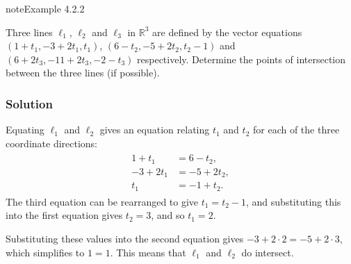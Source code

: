 \documentclass[letterpaper,10pt,english]{jupyterBook}
\begin{document}
\label{_pages/4.1_Lines:line-line-intersection-example}
\begin{sphinxadmonition}{note}{Example 4.2.2}



\sphinxAtStartPar
Three lines \(\ell_1\), \(\ell_2\) and \(\ell_3\) in \(\mathbb{R}^3\) are defined by the vector equations \((1 + t_1, -3 + 2t_1, t_1)\), \((6 - t_2, -5 + 2t_2, t_2 - 1)\) and \((6 + 2t_3, -11 + 2t_3, -2 - t_3)\) respectively. Determine the points of intersection between the three lines (if possible).
\subsubsection*{Solution}

\sphinxAtStartPar
Equating \(\ell_1\) and \(\ell_2\) gives an equation relating \(t_1\) and \(t_2\) for each of the three coordinate directions:
\begin{equation*}
\begin{split} \begin{align*}
    1 + t_1 &= 6 - t_2, \\
    -3 + 2t_1 &= -5 + 2t_2, \\
    t_1 &= -1 + t_2.
\end{align*} \end{split}
\end{equation*}
\sphinxAtStartPar
The third equation can be rearranged to give \(t_1 = t_2 - 1\), and substituting this into the first equation gives \(t_2 = 3\), and so \(t_1 = 2\).

\sphinxAtStartPar
Substituting these values into the second equation gives \(-3 + 2 \cdot 2 = -5 + 2 \cdot 3\), which simplifies to \(1 = 1\). This means that \(\ell_1\) and \(\ell_2\) do intersect.


\end{sphinxadmonition}
\end{document}
